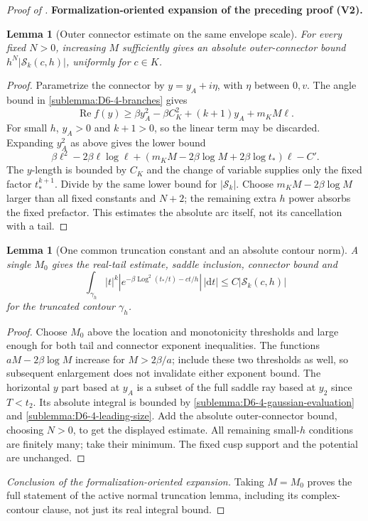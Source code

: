 \documentclass[11pt]{article}
\newtheorem{lemma}[theorem]{Lemma}
\newcommand{\formalisationparentid}{X}
\newenvironment{formalisationaddition}[1]{\par\medskip\begingroup\color{blue}\def\formalisationparentid{#1}\setcounter{formalizationsublemma}{0}\let\lemma\formalizationsublemma\let\endlemma\endformalizationsublemma
  \def\Eo{\mathcal E_h^\circ}\def\EE{\mathcal E_h}\def\phio{\phi_h^\circ}\def\phih{\phi_h}\def\Ho{H_h^{\rm atom}(v^\circ)}\def\Ha{H_h^{\rm atom}}\def\HL{H_h^{L}}\def\Dh{D_h}\def\Log{\operatorname{Log}}\def\ellh{\ell_h}\def\Gp{G_{p,h}}\def\Ast{A_{*,h}}\def\ahat{\widehat{\mathfrak a}_h}\def\ah{\mathfrak a_h}\def\rh{\widehat\rho_h}\def\deltah{\widehat\delta_h}\def\oldref##1{\textup{(##1)}}\def\interface##1{\par\noindent\textit{Analytical interface used here.} ##1\par}\def\finish{\par\noindent\textit{Conclusion of the formalization-oriented expansion.} }\par\noindent\textbf{Formalization-oriented expansion of the preceding proof (V2).}\par\smallskip
}{\par\endgroup\medskip
}
\newcommand{\Rea}{\operatorname{Re}}
\begin{document}
\begin{proof}[Proof of ]
\begin{formalisationaddition}{D-L6.6}
\begin{lemma}[Outer connector estimate on the same envelope scale]\label{sublemma:D6-6-connector}
For every fixed $N>0$, increasing $M$ sufficiently gives an absolute
outer-connector bound $h^N|\mathcal S_k(c,h)|$, uniformly for $c\in K$.
\end{lemma}
\begin{proof}
Parametrize the connector by $y=y_A+i\eta$, with $\eta$ between $0,v$.
The angle bound in \ref{sublemma:D6-4-branches} gives
\[
 \Rea f(y)\ge\beta y_A^2-\beta C_K^2+(k+1)y_A+m_KM\ell.
\]
For small $h$, $y_A>0$ and $k+1>0$, so the linear term may be discarded.
Expanding $y_A^2$ as above gives the lower bound
\[
 \beta\ell^2-2\beta\ell\log\ell
       +(m_KM-2\beta\log M+2\beta\log t_*)\ell-C'.
\]
The $y$-length is bounded by $C_K$ and the change of variable supplies
only the fixed factor $t_*^{k+1}$. Divide by the same lower bound for
$|\mathcal S_k|$. Choose $m_KM-2\beta\log M$ larger than all fixed constants
and $N+2$; the remaining extra $h$ power absorbs the fixed prefactor.
This estimates the absolute arc itself, not its cancellation with a tail.
\end{proof}

\begin{lemma}[One common truncation constant and an absolute contour norm]\label{sublemma:D6-6-common-choice}
A single $M_0$ gives the real-tail estimate, saddle inclusion, connector
bound and
\[
 \int_{\gamma_h}|t|^k
 |e^{-\beta\Log^2(t_*/t)-ct/h}|\,|\mathrm dt|\le C|\mathcal S_k(c,h)|
\]
for the truncated contour $\gamma_h$.
\end{lemma}
\begin{proof}
Choose $M_0$ above the location and monotonicity thresholds and large
enough for both tail and connector exponent inequalities.
The functions $aM-2\beta\log M$ increase for $M>2\beta/a$;
include these two thresholds as well, so subsequent enlargement does
not invalidate either exponent bound.
The horizontal $y$ part based at $y_A$ is a subset of the full saddle
ray based at $y_2$ since $T<t_2$. Its absolute integral is bounded by
\ref{sublemma:D6-4-gaussian-evaluation} and
\ref{sublemma:D6-4-leading-size}. Add the absolute outer-connector
bound, choosing $N>0$, to get the displayed estimate.
All remaining small-$h$ conditions are finitely many; take their
minimum. The fixed cusp support and the potential are unchanged.
\end{proof}
\finish Taking $M=M_0$ proves the full statement of the active normal
truncation lemma, including its complex-contour clause, not just its
real integral bound.
\end{formalisationaddition}

\end{proof}
\end{document}
